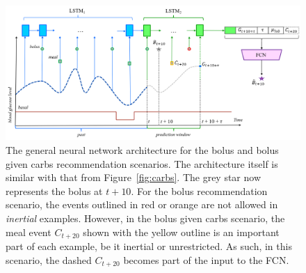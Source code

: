 \documentclass[graybox]{svmult}
\begin{document}
\begin{figure}[t]
    \includegraphics[width=\textwidth]{kdh_paper_diagram_2}
    \caption{The general neural network architecture for the bolus and bolus given carbs recommendation scenarios. The architecture itself is similar with that from Figure~\ref{fig:carbs}. The grey star now represents the bolus at $t+10$. For the bolus recommendation scenario, the events outlined in red or orange are not allowed in {\it inertial} examples.  However, in the bolus given carbs scenario, the meal event $C_{t+20}$ shown with the yellow outline is an important part of each example, be it inertial or unrestricted. As such, in this scenario, the dashed $C_{t+20}$ becomes part of the input to the FCN.}
    \label{fig:bolus}
\end{figure}
\end{document}
